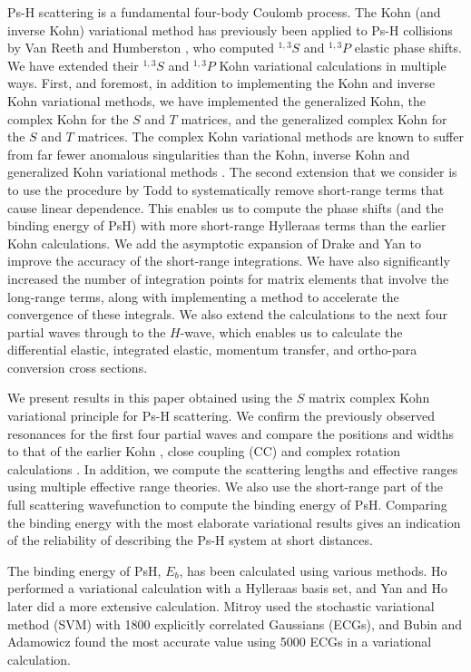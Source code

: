\documentclass[preprint,showpacs,showkeys,preprintnumbers,amsmath,amssymb,longbibliography,pra,aps]{revtex4-1}
\begin{document}
Ps-H scattering is a fundamental four-body Coulomb process. The Kohn (and 
inverse Kohn) variational method has previously been applied to Ps-H 
collisions by Van Reeth and Humberston \cite{VanReeth2003,VanReeth2004}, who 
computed $^{1,3}S$ and $^{1,3}P$ elastic phase shifts. We 
have extended their $^{1,3}S$ and $^{1,3}P$ Kohn variational calculations in 
multiple ways. First, and foremost, in addition to implementing
the Kohn and inverse Kohn variational methods, we have implemented the 
generalized Kohn, the complex Kohn for the $S$ and $T$ matrices, and the
generalized complex Kohn for the $S$ and $T$
matrices. The complex Kohn variational methods are known to suffer
from far fewer anomalous singularities than the Kohn, inverse Kohn and 
generalized Kohn variational methods
\cite{Lucchese1989, Cooper2009, Cooper2010}. The second extension that we
consider is to use the procedure by Todd 
\cite{Todd2007} to systematically remove short-range terms that cause linear 
dependence. This enables us to compute the phase shifts (and the binding 
energy of PsH) with more short-range Hylleraas terms than the earlier 
Kohn calculations. We add the asymptotic expansion of Drake and Yan
\cite{Drake1995, Yan1997} to improve the accuracy of the short-range
integrations. We have also significantly increased the number of integration
points for matrix
elements that involve the long-range terms, along with implementing a method to
accelerate the convergence of these integrals. We also extend the 
calculations to the next four partial waves through to the $H$-wave, which
enables us to calculate the differential elastic, integrated elastic, momentum
transfer, and ortho-para conversion cross sections.

We present results in this paper obtained using the $S$ matrix complex Kohn 
variational principle for Ps-H scattering. We confirm the previously observed 
resonances for the first four partial waves and compare the positions and 
widths to that of the earlier Kohn \cite{VanReeth2003,VanReeth2004}, close 
coupling (CC) \cite{Walters2004} and complex rotation calculations
\cite{Yan1999,Yan1998a,Ho1998,Ho2000}. In addition, we compute the scattering
lengths and effective ranges using multiple effective range theories. We also
use the short-range part of the full scattering wavefunction to compute the
binding energy of PsH. Comparing the binding energy with the most elaborate 
variational results gives an indication of the reliability of describing the 
Ps-H system at short distances.

The binding energy of PsH, $E_b$, has been calculated using various methods. 
Ho \cite{Ho1986} performed a variational calculation with a Hylleraas basis
set, and Yan and Ho \cite{Yan1999} later did a more extensive calculation.
Mitroy \cite{Mitroy2006} used the stochastic variational method (SVM) with
1800 explicitly correlated Gaussians (ECGs), and Bubin
and Adamowicz \cite{Bubin2006} found the most accurate value using 5000 ECGs
in a variational calculation.
\end{document}
